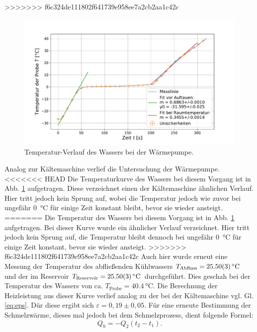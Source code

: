 >>>>>>> f6c324de111802f641739e958ee7a2cb2aa1c42c
	\begin{figure}[ht]
		\centering
		\includegraphics[width=\textwidth]{data/warm_machen.pdf}
		\caption{Temperatur-Verlauf des Wassers bei der Wärmepumpe.}
		\label{fig:Wärmepumpe}	
	\end{figure}
	Analog zur Kältemaschine verlief die Untersuchung der Wärmepumpe. 
<<<<<<< HEAD
	Die Temperaturkurve des Wassers bei diesem Vorgang ist in Abb. \ref{fig:Wärmepumpe} aufgetragen.
	Diese verzeichnet einen der Kältemaschine ähnlichen Verlauf.
	Hier tritt jedoch kein Sprung auf, wobei die Temperatur jedoch wie zuvor bei ungefähr \SI{0}{\celsius} für einige Zeit konstant bleibt, bevor sie wieder ansteigt.
=======
	Die Temperatur des Wassers bei diesem Vorgang ist in Abb. \ref{fig:Wärmepumpe} aufgetragen.
	Bei dieser Kurve wurde ein ähnlicher Verlauf verzeichnet.
	Hier tritt jedoch kein Sprung auf, die Temperatur bleibt dennoch  bei ungefähr \SI{0}{\celsius} für einige Zeit konstant, bevor sie wieder ansteigt.
>>>>>>> f6c324de111802f641739e958ee7a2cb2aa1c42c
	Auch hier wurde erneut eine Messung der Temperatur des abfließenden Kühlwassers $T_\text{Abfluss} = \SI{25,5+-0,03}{\celsius}$ und der im Reservoir $T_\text{Reservoir} = \SI{25,5+-0,03}{\celsius}$ durchgeführt.
	Dies geschah bei der Temperatur des Wassers von ca. $T_\text{Probe} = \SI{40,4}{\celsius}$.
	Die Berechnung der Heizleistung aus dieser Kurve verlief analog zu der bei der Kältemaschine vgl. Gl. \ref{eq:eps}.
	Dür diese ergibt sich $\varepsilon = 0,19\pm 0,05$.
	Für eine erneute Bestimmung der Schmelzwärme, dieses mal jedoch bei dem Schmelzprozess, dient folgende Formel:
	\begin{equation} %
		Q_\text{S} = -Q_2 (t_2 - t_1).
	\end{equation} %
